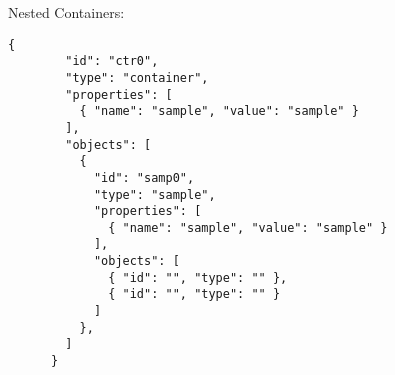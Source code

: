     Nested Containers:

    \begin{lstlisting}[caption={Nested Container Configuration in JSON},label={lst:cfg-json-nest-ctr}]
      {
        "id": "ctr0",
        "type": "container",
        "properties": [
          { "name": "sample", "value": "sample" }
        ],
        "objects": [
          {
            "id": "samp0",
            "type": "sample",
            "properties": [
              { "name": "sample", "value": "sample" }
            ],
            "objects": [
              { "id": "", "type": "" },
              { "id": "", "type": "" }
            ]
          },
        ]
      }
    \end{lstlisting}
